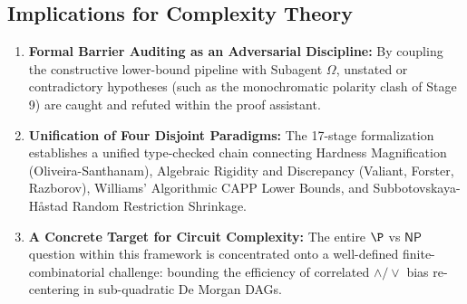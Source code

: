 \documentclass[11pt,a4paper]{article}
\theoremstyle{plain}
\theoremstyle{definition}
\theoremstyle{remark}
\newcommand{\NP}{\mathsf{NP}}
\begin{document}
\subsection{Implications for Complexity Theory}
\begin{enumerate}[noitemsep]
    \item \textbf{Formal Barrier Auditing as an Adversarial Discipline:} By coupling the constructive lower-bound pipeline with Subagent $\Omega$, unstated or contradictory hypotheses (such as the monochromatic polarity clash of Stage 9) are caught and refuted within the proof assistant.
    \item \textbf{Unification of Four Disjoint Paradigms:} The 17-stage formalization establishes a unified type-checked chain connecting Hardness Magnification (Oliveira-Santhanam), Algebraic Rigidity and Discrepancy (Valiant, Forster, Razborov), Williams' Algorithmic CAPP Lower Bounds, and Subbotovskaya-H\aa stad Random Restriction Shrinkage.
    \item \textbf{A Concrete Target for Circuit Complexity:} The entire $\P$ vs $\NP$ question within this framework is concentrated onto a well-defined finite-combinatorial challenge: bounding the efficiency of correlated $\land / \lor$ bias re-centering in sub-quadratic De Morgan DAGs.
\end{enumerate}
\end{document}
